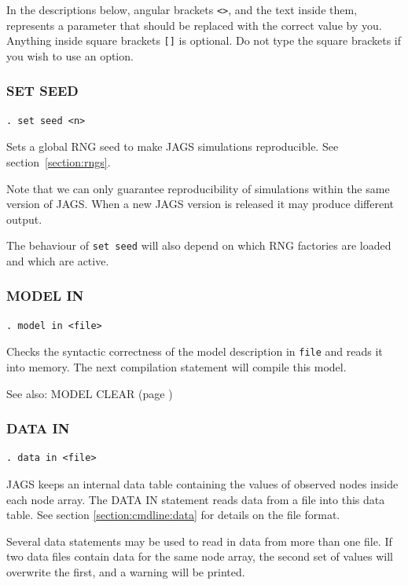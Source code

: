 \documentclass[11pt, a4paper, titlepage]{report}
\begin{document}
In the descriptions below, angular brackets \verb+<>+, and the text
inside them, represents a parameter that should be replaced with the
correct value by you.  Anything inside square brackets \verb+[]+ is
optional. Do not type the square brackets if you wish to use an
option.

\subsubsection{SET SEED}

\begin{verbatim}
. set seed <n>
\end{verbatim}

Sets a global RNG seed to make JAGS simulations reproducible. See
section~\ref{section:rngs}.

Note that we can only guarantee reproducibility of simulations within
the same version of JAGS. When a new JAGS version is released it may
produce different output.

The behaviour of \texttt{set seed} will also depend on which RNG
factories are loaded and which are active.

\subsubsection{MODEL IN}

\begin{verbatim}
. model in <file>
\end{verbatim}
Checks the syntactic correctness of the model description in
\texttt{file} and reads it into memory. The next compilation
statement will compile this model. 

See also: MODEL CLEAR (page \pageref{model:clear})

\subsubsection{DATA IN}
\label{data:in}

\begin{verbatim}
. data in <file>
\end{verbatim}
JAGS keeps an internal data table containing the values of observed
nodes inside each node array.  The DATA IN statement reads data from a
file into this data table. See section \ref{section:cmdline:data} for
details on the file format.

Several data statements may be used to read in data from more than one
file. If two data files contain data for the same node array, the second
set of values will overwrite the first, and a warning will be printed.
\end{document}
